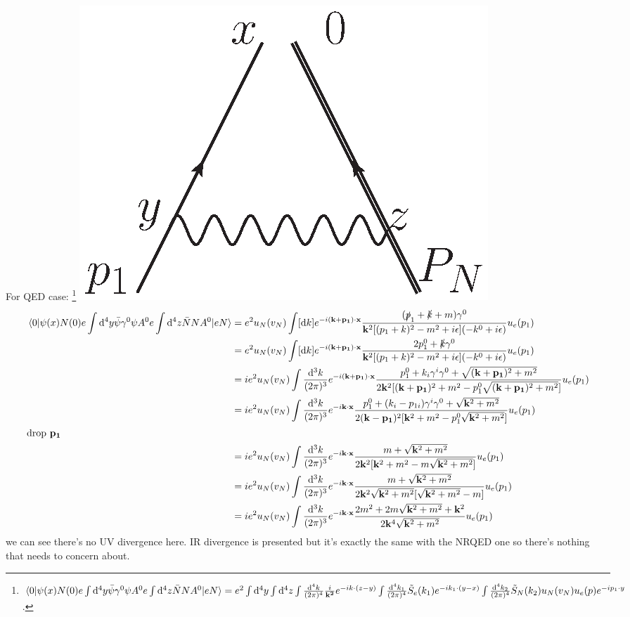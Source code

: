 \documentclass{article}
\newcommand{\g}{\gamma}
\begin{document}
For QED case:
 \footnote{$\mel{0}{\psi(x)N(0)e\int\dd^4y\bar\psi\g^0\psi A^0 e\int\dd^4 z \bar N NA^0}{eN}=e^2\int\dd^4y\int\dd^4z\int\frac{\dd^4k}{(2\pi)^4}\frac{i}{\vb{k^2}}e^{-ik\cdot(z-y)}\int\frac{\dd^4k_1}{(2\pi)^4}\tilde S_e(k_1)e^{-ik_1\cdot(y-x)}\int\frac{\dd^4k_2}{(2\pi)^4}\tilde S_N(k_2)u_N(v_N)u_e(p)e^{-ip_1\cdot y}$.}
\includegraphics[width=1.2 in]{OPE-2.eps}
\begin{align*}
  \mel{0}{\psi(x)N(0)e\int\dd^4y\bar\psi\g^0\psi A^0 e\int\dd^4 z \bar N NA^0}{eN}&=e^2u_N(v_N)\int[\dd k]e^{-i\vb{(k+p_1)}\cdot\vb{x}}\frac{(\slashed p_1+\slashed k+m)\g^0}{\vb{k}^2[(p_1+k)^2-m^2+i\epsilon](-k^0+i\epsilon)}u_e(p_1)\\
  &=e^2u_N(v_N)\int[\dd k]e^{-i\vb{(k+p_1)}\cdot\vb{x}}\frac{2p_1^0+\slashed k\g^0}{\vb{k}^2[(p_1+k)^2-m^2+i\epsilon](-k^0+i\epsilon)}u_e(p_1)\\
  &=ie^2u_N(v_N)\int\frac{\dd^3 k}{(2\pi)^3}e^{-i\vb{(k+p_1)}\cdot\vb{x}}\frac{p_1^0+k_i\g^i\g^0+\sqrt{(\vb{k}+\vb{p_1})^2+m^2}}{2\vb{k}^2[(\vb{k}+\vb{p_1})^2+m^2-p_1^0\sqrt{(\vb{k}+\vb{p_1})^2+m^2}]}u_e(p_1)\\
  &=ie^2u_N(v_N)\int\frac{\dd^3 k}{(2\pi)^3}e^{-i\vb{k}\cdot\vb{x}}\frac{p_1^0+(k_i-p_{1i})\g^i\g^0+\sqrt{\vb{k}^2+m^2}}{2(\vb{k}-\vb{p_1})^2[\vb{k}^2+m^2-p_1^0\sqrt{\vb{k}^2+m^2}]}u_e(p_1)\\
  \intertext{drop $\vb{p_1}$}
  &=ie^2u_N(v_N)\int\frac{\dd^3 k}{(2\pi)^3}e^{-i\vb{k}\cdot\vb{x}}\frac{m+\sqrt{\vb{k}^2+m^2}}{2\vb{k}^2[\vb{k}^2+m^2-m\sqrt{\vb{k}^2+m^2}]}u_e(p_1)\\
  &=ie^2u_N(v_N)\int\frac{\dd^3 k}{(2\pi)^3}e^{-i\vb{k}\cdot\vb{x}}\frac{m+\sqrt{\vb{k}^2+m^2}}{2\vb{k}^2\sqrt{\vb{k}^2+m^2}[\sqrt{\vb{k}^2+m^2}-m]}u_e(p_1)\\
  &=ie^2u_N(v_N)\int\frac{\dd^3 k}{(2\pi)^3}e^{-i\vb{k}\cdot\vb{x}}\frac{2m^2+2m\sqrt{\vb{k}^2+m^2}+\vb{k}^2}{2\vb{k}^4\sqrt{\vb{k}^2+m^2}}u_e(p_1)
\end{align*}%
we can see there's no UV divergence here. IR divergence is presented but it's exactly the same with the NRQED one so there's nothing that needs to concern about.
\end{document}
